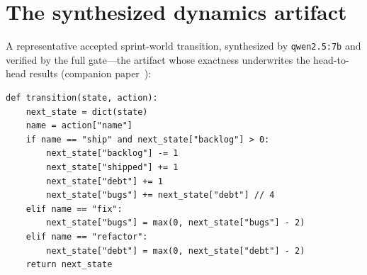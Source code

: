 \documentclass[11pt]{article}
\begin{document}
\begin{table}[htb]\centering\small

\caption{E2 + E16: synthesis reliability by generator scale and family.
Qwen rows: five compilation attempts per world; Llama/Gemma rows: three per
world. Maximum four verify--repair iterations each; wall-clock includes all
iterations.}
\label{tab:synthesis-app}
\end{table}

\begin{table}[htb]\centering\small

\caption{E18: filter-vs-repair decomposition of the full verification gate
(3B generator, eight paired high-temperature attempts per regime).}
\label{tab:repair-app}
\end{table}

\begin{table}[htb]\centering\small

\caption{E19: exact transition accuracy on the branch-covering probe suite
across a 1$\times$/10$\times$/100$\times$ scale ladder.}
\label{tab:ladder-app}
\end{table}

\begin{table}[htb]\centering\small

\caption{E9: tuning-strategy comparison on the triage auto-configuration
problem; ten seeds per strategy, \TuningBudget-trial budget.}
\label{tab:tuning-app}
\end{table}

\section{The synthesized dynamics artifact}\label{app:figs}
A representative accepted sprint-world transition, synthesized by
\texttt{qwen2.5:7b} and verified by the full gate---the artifact whose
exactness underwrites the head-to-head results (companion paper~\cite{openworld_wtc}):

\begin{tcolorbox}[policycard, cardcol=cardteal,
  title=Accepted \texttt{transition()} (verbatim)]
\begin{lstlisting}[style=housespecyamlbare]
def transition(state, action):
    next_state = dict(state)
    name = action["name"]
    if name == "ship" and next_state["backlog"] > 0:
        next_state["backlog"] -= 1
        next_state["shipped"] += 1
        next_state["debt"] += 1
        next_state["bugs"] += next_state["debt"] // 4
    elif name == "fix":
        next_state["bugs"] = max(0, next_state["bugs"] - 2)
    elif name == "refactor":
        next_state["debt"] = max(0, next_state["debt"] - 2)
    return next_state
\end{lstlisting}
\end{tcolorbox}
\end{document}

